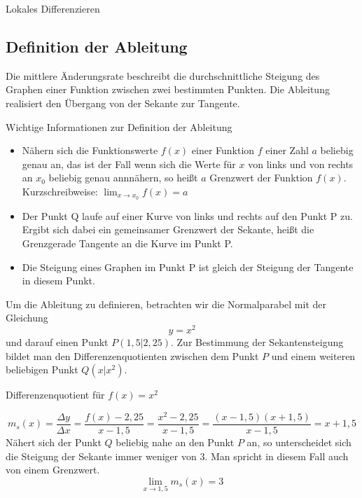 \begin{section}{Lokales Differenzieren}
\subsection{Definition der Ableitung}
Die mittlere Änderungsrate beschreibt die durchschnittliche Steigung des Graphen einer Funktion zwischen zwei bestimmten Punkten. Die Ableitung realisiert den Übergang von der Sekante zur Tangente.
\begin{merke*}{Wichtige Informationen zur Definition  der Ableitung}
\begin{itemize}
 \item Nähern sich die Funktionswerte $f(x)$ einer Funktion $f$ einer Zahl $a$ beliebig genau an, das ist der Fall wenn sich die Werte für $x$ von links und von rechts an $x_0$ beliebig genau annnähern, so heißt $a$ Grenzwert der Funktion $f(x)$. Kurzschreibweise: $\lim_{x \rightarrow x_0} f(x)= a$ 
 \item Der Punkt Q laufe auf einer Kurve von links und rechts auf den Punkt P zu. Ergibt sich dabei ein gemeinsamer Grenzwert der Sekante, heißt die Grenzgerade Tangente an die Kurve im Punkt P.
 \item Die Steigung eines Graphen im Punkt P ist gleich der Steigung der Tangente in diesem Punkt.
\end{itemize}
\end{merke*}
Um die Ableitung zu definieren, betrachten wir die Normalparabel mit der Gleichung $$ y=x^2 $$ und darauf einen Punkt $P(1,5|2,25)$. Zur Bestimmung der Sekantensteigung bildet man den Differenzenquotienten zwischen dem Punkt $P$ und einem weiteren beliebigen Punkt $Q(x|x^2)$. 
\begin{bem*}{Differenzenquotient für $f(x) =x^2 $}
  
  $$ m_s(x)= \dfrac{\Delta y}{\Delta x} = \dfrac{f(x) - 2,25}{x - 1,5} = \dfrac{x^2 - 2,25}{x- 1,5} = \dfrac{(x-1,5)(x+1,5)}{x-1,5} =x+1,5 $$
Nähert sich der Punkt $Q$ beliebig nahe an den Punkt $P$ an, so unterscheidet sich die Steigung der Sekante immer weniger von 3. Man spricht in diesem Fall auch von einem Grenzwert.
$$\lim_{x\rightarrow 1,5} m_s(x) = 3$$
\end{bem*}


\end{section}
